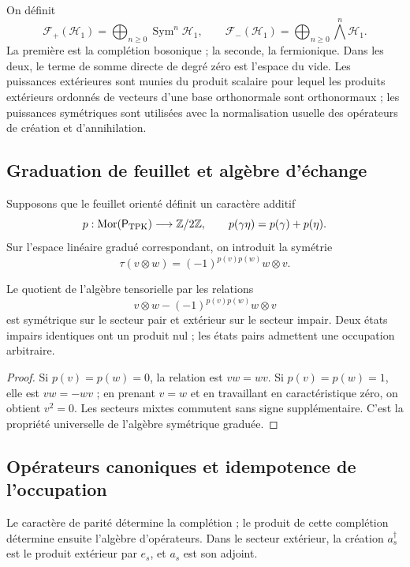 On définit
\[
 \mathcal F_+(\mathcal H_1)=
 \bigoplus_{n\geq0}\operatorname{Sym}^n\mathcal H_1,
 \qquad
 \mathcal F_-(\mathcal H_1)=
 \bigoplus_{n\geq0}\bigwedge^n\mathcal H_1.
\]
La première est la complétion bosonique ; la seconde, la fermionique. Dans les deux,
le terme de somme directe de degré zéro est l’espace du vide. Les puissances extérieures
sont munies du produit scalaire pour lequel les produits extérieurs ordonnés de vecteurs
d’une base orthonormale sont orthonormaux ; les puissances symétriques sont utilisées
avec la normalisation usuelle des opérateurs de création et d’annihilation.

\subsection{Graduation de feuillet et algèbre d’échange}
\label{v:rec:completaciones:section:04}

Supposons que le feuillet orienté définit un caractère additif
\[
 p:\operatorname{Mor}(\mathsf P_{\rm TPK})\longrightarrow\mathbb Z/2\mathbb Z,
 \qquad p(\gamma\eta)=p(\gamma)+p(\eta).
\]
Sur l’espace linéaire gradué correspondant, on introduit la symétrie
\[
 \tau(v\otimes w)=(-1)^{p(v)p(w)}w\otimes v.
\]

\begin{theorem}
\label{v:rec:completaciones:statement:02}
Le quotient de l’algèbre tensorielle par les relations
\[
 v\otimes w-(-1)^{p(v)p(w)}w\otimes v
\]
est symétrique sur le secteur pair et extérieur sur le secteur impair. Deux états
impairs identiques ont un produit nul ; les états pairs admettent une occupation
arbitraire.
\end{theorem}

\begin{proof}
Si \(p(v)=p(w)=0\), la relation est \(vw=wv\). Si
\(p(v)=p(w)=1\), elle est \(vw=-wv\) ; en prenant \(v=w\) et en travaillant en
caractéristique zéro, on obtient \(v^2=0\). Les secteurs mixtes commutent sans
signe supplémentaire. C’est la propriété universelle de l’algèbre symétrique
graduée.
\end{proof}

\subsection{Opérateurs canoniques et idempotence de l’occupation}
\label{v:pauli:car-construccion}

Le caractère de parité détermine la complétion ; le produit de cette
complétion détermine ensuite l’algèbre d’opérateurs. Dans le
secteur extérieur, la création \(a_s^\dagger\) est le produit extérieur par
\(e_s\), et \(a_s\) est son adjoint.

